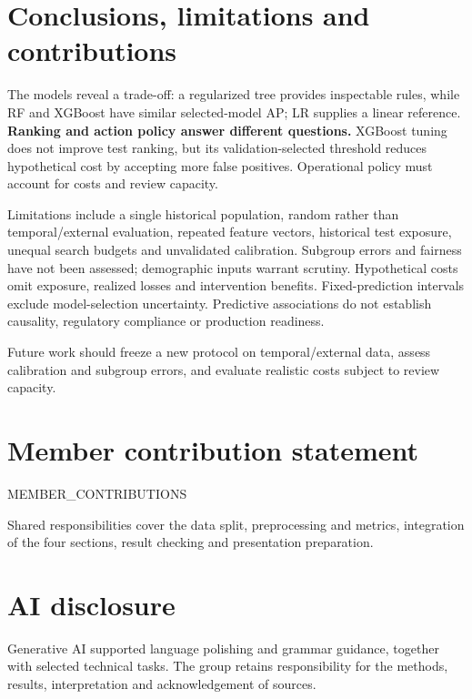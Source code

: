 \documentclass{article}
\begin{document}
\section{Conclusions, limitations and contributions}
The models reveal a trade-off: a regularized tree provides inspectable rules, while RF and XGBoost have similar selected-model AP; LR supplies a linear reference. \textbf{Ranking and action policy answer different questions.} XGBoost tuning does not improve test ranking, but its validation-selected threshold reduces hypothetical cost by accepting more false positives. Operational policy must account for costs and review capacity.

Limitations include a single historical population, random rather than temporal/external evaluation, repeated feature vectors, historical test exposure, unequal search budgets and unvalidated calibration. Subgroup errors and fairness have not been assessed; demographic inputs warrant scrutiny. Hypothetical costs omit exposure, realized losses and intervention benefits. Fixed-prediction intervals exclude model-selection uncertainty. Predictive associations do not establish causality, regulatory compliance or production readiness.

Future work should freeze a new protocol on temporal/external data, assess calibration and subgroup errors, and evaluate realistic costs subject to review capacity.

\section*{Member contribution statement}
\begin{center}
\begin{minipage}{\linewidth}
\centering
{{MEMBER_CONTRIBUTIONS}}
\end{minipage}
\end{center}
Shared responsibilities cover the data split, preprocessing and metrics, integration of the four sections, result checking and presentation preparation.

\section*{AI disclosure}
Generative AI supported language polishing and grammar guidance, together with selected technical tasks. The group retains responsibility for the methods, results, interpretation and acknowledgement of sources.
\end{document}
